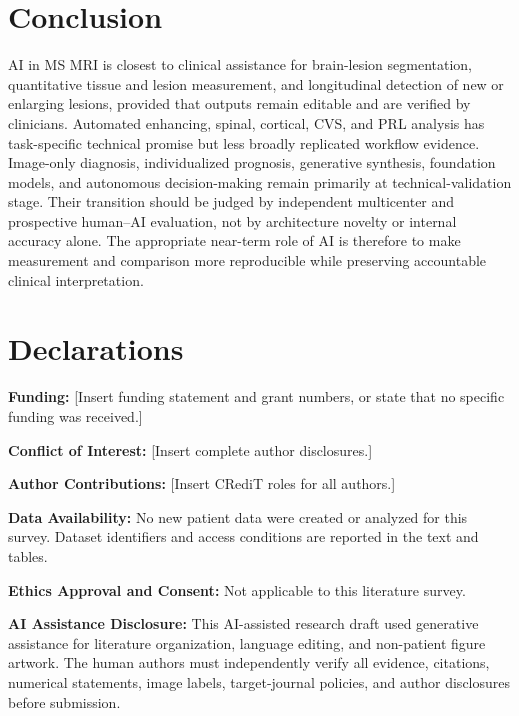 \documentclass[journal,twoside,web]{ieeecolor}
\begin{document}
\FloatBarrier

\clearpage

\section{Conclusion}\label{sec:conclusion}

AI in MS MRI is closest to clinical assistance for brain-lesion segmentation, quantitative tissue and lesion measurement, and longitudinal detection of new or enlarging lesions, provided that outputs remain editable and are verified by clinicians. Automated enhancing, spinal, cortical, CVS, and PRL analysis has task-specific technical promise but less broadly replicated workflow evidence. Image-only diagnosis, individualized prognosis, generative synthesis, foundation models, and autonomous decision-making remain primarily at technical-validation stage. Their transition should be judged by independent multicenter and prospective human--AI evaluation, not by architecture novelty or internal accuracy alone. The appropriate near-term role of AI is therefore to make measurement and comparison more reproducible while preserving accountable clinical interpretation.


\section*{Declarations}\label{sec:declarations}

\textbf{Funding:} [Insert funding statement and grant numbers, or state that no specific funding was received.]


\textbf{Conflict of Interest:} [Insert complete author disclosures.]


\textbf{Author Contributions:} [Insert CRediT roles for all authors.]


\textbf{Data Availability:} No new patient data were created or analyzed for this survey. Dataset identifiers and access conditions are reported in the text and tables.


\textbf{Ethics Approval and Consent:} Not applicable to this literature survey.


\textbf{AI Assistance Disclosure:} This AI-assisted research draft used generative assistance for literature organization, language editing, and non-patient figure artwork. The human authors must independently verify all evidence, citations, numerical statements, image labels, target-journal policies, and author disclosures before submission.
\end{document}
